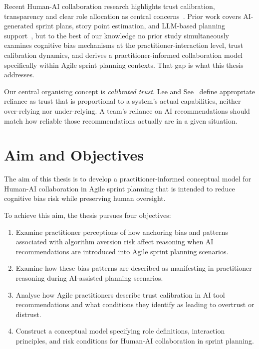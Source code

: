 \documentclass[a4paper,twoside]{bth}
\begin{document}
Recent Human-AI collaboration research highlights trust calibration, transparency and clear role allocation as central concerns~\cite{aman2025systematic, hamza2025agile}. Prior work covers AI-generated sprint plans, story point estimation, and LLM-based planning support~\cite{kula2024context, choetkiertikul2018deep, muneer2025leveraging}, but to the best of our knowledge no prior study simultaneously examines cognitive bias mechanisms at the practitioner-interaction level, trust calibration dynamics, and derives a practitioner-informed collaboration model specifically within Agile sprint planning contexts. That gap is what this thesis addresses.

Our central organising concept is \textit{calibrated trust}. Lee and See~\cite{lee2004trust} define appropriate reliance as trust that is proportional to a system's actual capabilities, neither over-relying nor under-relying. A team's reliance on AI recommendations should match how reliable those recommendations actually are in a given situation.

\section{Aim and Objectives}

The aim of this thesis is to develop a practitioner-informed conceptual model for Human-AI collaboration in Agile sprint planning that is intended to reduce cognitive bias risk while preserving human oversight.

To achieve this aim, the thesis pursues four objectives:
\begin{enumerate}
  \item Examine practitioner perceptions of how anchoring bias and patterns associated with algorithm aversion risk affect reasoning when AI recommendations are introduced into Agile sprint planning scenarios.
  \item Examine how these bias patterns are described as manifesting in practitioner reasoning during AI-assisted planning scenarios.
  \item Analyse how Agile practitioners describe trust calibration in AI tool recommendations and what conditions they identify as leading to overtrust or distrust.
  \item Construct a conceptual model specifying role definitions, interaction principles, and risk conditions for Human-AI collaboration in sprint planning.
\end{enumerate}
\end{document}
